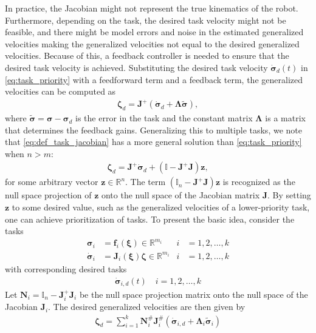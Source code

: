 In practice, the Jacobian might not represent the true kinematics of the robot.
Furthermore, depending on the task, the desired task velocity might not be feasible,
and there might be model errors and noise in the estimated generalized velocities making
the generalized velocities not equal to the desired generalized velocities. Because of this,
a feedback controller is needed to ensure that the desired task velocity is
achieved. Substituting the desired task velocity \(\dot{\bm{\sigma}}_d(t)\) in 
\autoref{eq:task_priority} with
a feedforward term and a feedback term, the generalized velocities can be computed as
\begin{align}
    \bm{\zeta}_d = \bm{J}^{+} \left(\dot{\bm{\sigma}}_d + \bm{\Lambda}\tilde{\bm{\sigma}}\right),
\end{align}
where $\tilde{\bm{\sigma}} = \bm{\sigma} - \bm{\sigma}_d$ is the error in the
task and the constant matrix $\bm{\Lambda}$ is a matrix that determines the
feedback gains.
Generalizing this to multiple tasks, we note that \autoref{eq:def_task_jacobian}
has a more general solution than \autoref{eq:task_priority} when $n > m$:
\begin{align}
    \bm{\zeta}_d = \bm{J}^{+} \dot{\bm{\sigma}}_d + (\mathbb{I} - \bm{J}^{+} \bm{J}) \bm{z},
\end{align}
for some arbitrary vector $\bm{z} \in \mathbb{R}^n$. The term
$(\mathbb{I}_n - \bm{J}^{+} \bm{J}) \bm{z}$ is recognized as the null space projection
of $\bm{z}$ onto the null space of the Jacobian matrix $\bm{J}$. By setting
$\bm{z}$ to some desired value, such as the generalized velocities of a lower-priority task,
one can achieve prioritization of tasks. To present the basic idea, consider the
tasks
\begin{subequations}
\begin{align}
    \bm{\sigma}_i &= \bm{f}_i(\bm{\xi}) \in \mathbb{R}^{m_i} &i &= 1, 2, \ldots, k \\
    \dot{\bm{\sigma}}_i &= \bm{J}_i(\bm{\xi}) \bm{\zeta} \in \mathbb{R}^{m_i} &i &= 1, 2, \ldots, k
\end{align}
\end{subequations}
with corresponding desired tasks
\begin{align}
    \dot{\bm{\sigma}}_{i,d}(t) \quad i = 1, 2, \ldots, k
\end{align}
Let $\bm{N}_i = \mathbb{I}_n - \bm{J}_i^{+} \bm{J}_i$ be the null space projection
matrix onto the null space of the Jacobian $\bm{J}_i$.
The desired generalized velocities are then given by
\begin{align}
    \bm{\zeta}_d = \sum_{i=1}^k \bm{N}_i^{\#}\bm{J}_i^{\#} \left(\dot{\bm{\sigma}}_{i,d} + \bm{\Lambda}_i \tilde{\bm{\sigma}}_i\right) \label{eq:task_priority_vel}
\end{align}
